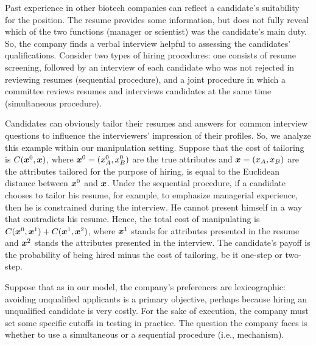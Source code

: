  Past experience in other biotech companies can reflect a candidate's
 suitability for the position. The resume provides some information, but does not fully reveal which of the two functions (manager or scientist) was the candidate's main duty. So, the company finds a verbal interview helpful to assessing the candidates' qualifications. 
Consider two types of hiring
procedures: one consists of resume screening, followed by an interview of
each candidate who was not rejected in reviewing resumes (sequential
procedure), and a joint procedure in which a committee reviews resumes and
interviews candidates at the same time (simultaneous procedure).

Candidates can obviously tailor their resumes and answers for common
interview questions to influence the interviewers' impression of their
profiles. So, we analyze this example within our manipulation setting.
Suppose that the cost of tailoring is $C(\boldsymbol{x}^0,\boldsymbol{x})$, where $%
\orifeatures=(x_{A}^{0},x_{B}^{0})$ are the true attributes and $\boldsymbol{x}=(x_{A},x_{B})$ are
the attributes tailored for the purpose of hiring, is equal to the Euclidean
distance between $\boldsymbol{x}^0$ and $\boldsymbol{x}$. Under the sequential procedure, if a
candidate chooses to tailor his resume, for example, to emphasize managerial
experience, then he is constrained during the interview. He cannot present
himself in a way that contradicts his resume. Hence, the total cost of
manipulating is $C(\boldsymbol{x}^0,\boldsymbol{x}^1)+C(\boldsymbol{x}^1,\boldsymbol{x}^2)$, where $\boldsymbol{x}^1$ stands for
attributes presented in the resume and $\boldsymbol{x}^2$ stands the attributes presented
in the interview. The candidate's payoff is the probability of being hired
minus the cost of tailoring, be it one-step or two-step.

Suppose that as in our model, the company's preferences are lexicographic:
avoiding unqualified applicants is a primary objective, perhaps because
hiring an unqualified candidate is very costly. For the sake of execution,
the company must set some specific cutoffs in testing in practice. The
question the company faces is whether to use a simultaneous or a sequential
procedure (i.e., mechanism).\bigskip 



